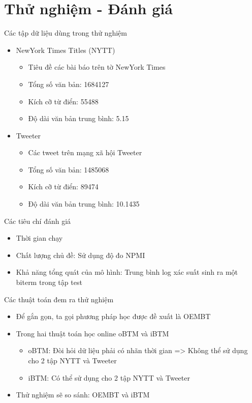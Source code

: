 \documentclass[pdf]{beamer}
\begin{document}
\section{Thử nghiệm - Đánh giá}
\begin{frame}{Các tập dữ liệu dùng trong thử nghiệm}
	\begin{itemize}
		\item NewYork Times Titles (NYTT)
			\begin{itemize}
				\item Tiêu đề các bài báo trên tờ NewYork Times
				\item Tổng số văn bản: 1684127
				\item Kích cỡ từ điển: 55488
				\item Độ dài văn bản trung bình: 5.15
			\end{itemize}
		\item Tweeter
			\begin{itemize}
				\item Các tweet trên mạng xã hội Tweeter
				\item Tổng số văn bản: 1485068
				\item Kích cỡ từ điển: 89474
				\item Độ dài văn bản trung bình: 10.1435
			\end{itemize}
	\end{itemize}
\end{frame}

\begin{frame}{Các tiêu chí đánh giá}
	\begin{itemize}
		\item Thời gian chạy
		\item Chất lượng chủ đề: Sử dụng độ đo NPMI
		\item Khả năng tổng quát của mô hình: Trung bình log xác suất sinh ra một biterm trong tập test
	\end{itemize}
\end{frame}

\begin{frame}{Các thuật toán đem ra thử nghiệm}
	\begin{itemize}
		\item Để gắn gọn, ta gọi phương pháp học được đề xuất là OEMBT
		\item Trong hai thuật toán học online oBTM và iBTM
			\begin{itemize}
				\item oBTM: Đòi hỏi dữ liệu phải có nhãn thời gian => Không thể sử dụng cho 2 tập NYTT và Tweeter
				\item iBTM: Có thể sử dụng cho 2 tập NYTT và Tweeter
			\end{itemize}
		\item Thử nghiệm sẽ so sánh: OEMBT và iBTM
	\end{itemize}
\end{frame}
\end{document}
